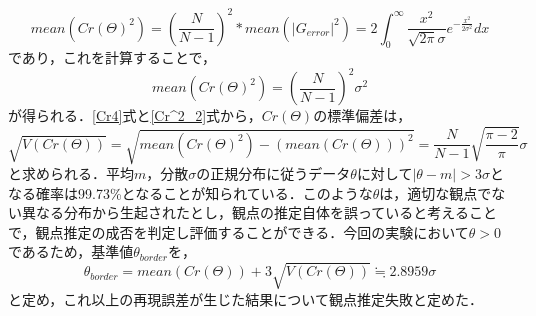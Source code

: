 	\begin{equation}
		\label{Cr^2_1}
		mean(Cr(Θ)^2) = \left(\frac{N}{N-1}\right)^2 * mean(|G_{error}|^2) 
		= 2\int_{0}^{\infty}\frac{x^2}{\sqrt{2\pi}σ}e^{-\frac{x^2}{2σ^2}}dx
	\end{equation}
であり，これを計算することで，
	\begin{equation}
		\label{Cr^2_2}
		mean(Cr(Θ)^2) = \left(\frac{N}{N-1}\right)^2 σ^2
	\end{equation}
が得られる．\ref{Cr4}式と\ref{Cr^2_2}式から，$Cr(Θ)$の標準偏差は，
	\begin{equation}
		\sqrt{V(Cr(Θ))} = \sqrt{mean(Cr(Θ)^2) - \left(mean(Cr(Θ))\right)^2} = \frac{N}{N-1}\sqrt{\frac{\pi-2}{\pi}}σ
	\end{equation}
と求められる．平均$m$，分散$σ$の正規分布に従うデータ$θ$に対して$|θ-m|>3σ$となる確率は99.73\%となることが知られている．このような$θ$は，適切な観点でない異なる分布から生起されたとし，観点の推定自体を誤っていると考えることで，観点推定の成否を判定し評価することができる．今回の実験において$θ>0$であるため，基準値$θ_{border}$を，
	\begin{equation}
		θ_{border} = mean(Cr(Θ))+3\sqrt{V(Cr(Θ))}≒2.8959σ
	\end{equation}
と定め，これ以上の再現誤差が生じた結果について観点推定失敗と定めた．



